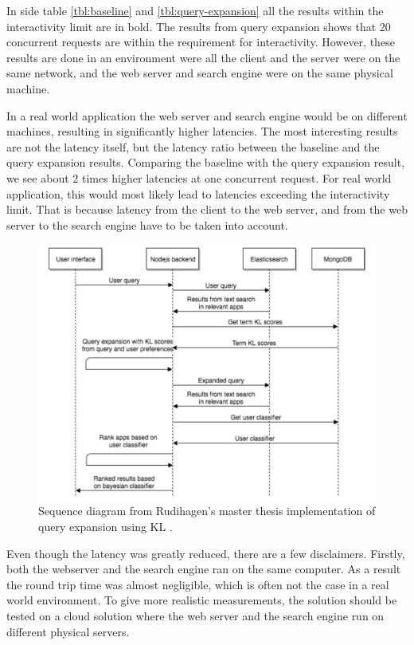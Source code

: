 In side table \ref{tbl:baseline} and \ref{tbl:query-expansion} all the results within the interactivity limit are in bold.
The results from query expansion shows that 20 concurrent requests are within the requirement for interactivity.
However, these results are done in an environment were all the client and the server were on the same network,
and the web server and search engine were on the same physical machine.

In a real world application the web server and search engine would be on different machines,
resulting in significantly higher latencies.
The most interesting results are not the latency itself, but the latency ratio between the baseline and the query expansion results.
Comparing the baseline with the query expansion result, we see about 2 times higher latencies at one concurrent request.
For real world application, this would most likely lead to latencies exceeding the interactivity limit.
That is because latency from the client to the web server, and from the web server to the search engine have to be taken into account.


\begin{figure}[h!]
\centering \includegraphics[width=0.9\linewidth]{img/sequence-diagram-search-master-thesis.png}
\caption{Sequence diagram from Rudihagen's master thesis implementation of query expansion using KL \cite[p. 37]{master-thesis}.}
\label{fig:sequence-diagram-search-master}
\end{figure}

Even though the latency was greatly reduced, there are a few disclaimers.
Firstly, both the webserver and the search engine ran on the same computer.
As a result the round trip time was almost negligible, which is often not the case in a real world environment.
To give more realistic measurements, the solution should be tested on a cloud solution where the web server and the search engine run on different physical servers.

